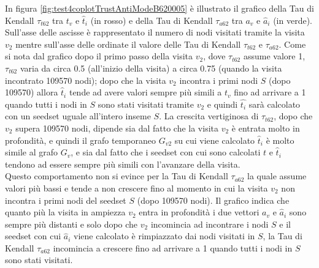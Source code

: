 In figura \ref{fig:test4coplotTrustAntiModeB620005} è illustrato il grafico della Tau di Kendall \(\tau_{t62}\) tra \(t_v\) e \(\hat{t}_i\) (in rosso)  e della Tau di Kendall \(\tau_{a62}\) tra \(a_v\) e \(\hat{a}_i\) (in verde). Sull'asse delle ascisse è rappresentato il numero di nodi visitati tramite la visita \(v_2\) mentre sull'asse delle ordinate il valore delle Tau di Kendall \(\tau_{t62}\) e \(\tau_{a62}\). Come si nota dal grafico dopo il primo passo della visita \(v_2\), dove \(\tau_{t62}\) assume valore 1, \(\tau_{t62}\) varia da circa 0.5 (all'inizio della visita) a circa 0.75 (quando la visita incontrato 109570 nodi);  dopo che la visita \(v_2\) incontra i primi nodi  \(S\) (dopo 109570) allora \(\hat{t}_i\) tende ad avere valori sempre più simili a \(t_v\) fino ad arrivare a 1 quando tutti i nodi in \(S\) sono stati visitati tramite \(v_2\) e quindi  \(\hat{t_i}\) sarà calcolato con un seedset uguale all'intero inseme \(S\). La crescita vertiginosa di \(\tau_{t62}\), dopo che \(v_2\) supera 
109570 nodi, dipende sia dal fatto che la visita \(v_2\) è entrata molto in profondità, e quindi il grafo temporaneo \(G_{v2}\) su cui viene calcolato \(\hat{t}_i\) è molto simile al grafo \(G_v\), e sia dal fatto che i seedset con cui sono calcolati \(t\) e \(\hat{t}_i\) tendono ad essere sempre più simili con l'avanzare della visita.\\ 
Questo comportamento non si evince per la Tau di Kendall \(\tau_{a62}\) la quale assume valori più bassi  e tende a non crescere fino al momento in cui la visita \(v_2\) non incontra i primi nodi del seedset \(S\) (dopo 109570 nodi). Il grafico indica che quanto più la visita in ampiezza \(v_2\) entra in profondità i due vettori \(a_v\) e \(\hat{a}_i\) sono sempre più distanti e solo dopo che \(v_2\) incomincia ad incontrare i nodi \(S\) e il seedset con cui \(\hat{a}_i\) viene calcolato è rimpiazzato dai nodi visitati in \(S\), la Tau di Kendall \(\tau_{a62}\) incomincia a crescere fino ad arrivare a 1 quando tutti i nodi  in \(S\) sono stati visitati.
